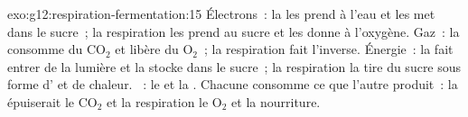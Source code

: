 \begin{solution}{exo:g12:respiration-fermentation:15}
Électrons~: la  les prend à l'eau et les met dans le
sucre~; la respiration les prend au sucre et les donne à l'oxygène.
Gaz~: la  consomme du $\mathrm{CO_2}$ et libère du
$\mathrm{O_2}$~; la respiration fait l'inverse. Énergie~: la
 fait entrer de la lumière et la stocke dans le sucre~;
la respiration la tire du sucre sous forme d' et de chaleur.
~: le  et la . Chacune consomme ce
que l'autre produit~: la  épuiserait le $\mathrm{CO_2}$
et la respiration le $\mathrm{O_2}$ et la nourriture.
\end{solution}

